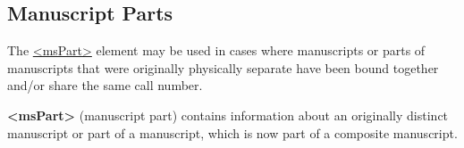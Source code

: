 \subsection[{Manuscript Parts}]{Manuscript Parts}\label{mspt}\par
The \hyperref[TEI.msPart]{<msPart>} element may be used in cases where manuscripts or parts of manuscripts that were originally physically separate have been bound together and/or share the same call number. 
\begin{sansreflist}
  
\item [\textbf{<msPart>}] (manuscript part) contains information about an originally distinct manuscript or part of a manuscript, which is now part of a composite manuscript.
\end{sansreflist}
\par
